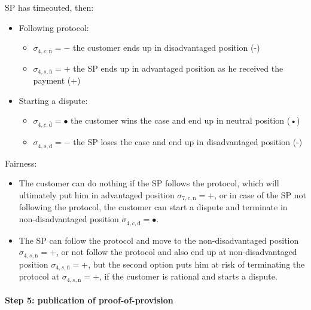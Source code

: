\documentclass{ieeeaccess}
\begin{document}
SP has timeouted, then:

\begin{itemize}
\item
  Following protocol:

  \begin{itemize}
  
  \item
    \(\sigma_{4, c, \overline{\mathrm{n}}} = -\) the customer ends up in
    disadvantaged position (-)
  \item
    \(\sigma_{4, s, \overline{\mathrm{n}}} = +\) the SP ends up in
    advantaged position as he received the payment (+)
  \end{itemize}
\item
  Starting a dispute:

  \begin{itemize}
  
  \item
    \(\sigma_{4, c, \overline{\mathrm{d}}} = •\) the customer wins the
    case and end up in neutral position (•)
  \item
    \(\sigma_{4, s, \overline{\mathrm{d}}} = -\) the SP loses the case
    and end up in disadvantaged position (-)
  \end{itemize}
\end{itemize}

Fairness:

\begin{itemize}

\item
  The customer can do nothing if the SP follows the protocol, which will
  ultimately put him in advantaged position
  \(\sigma_{7, c, \mathrm{n}} = +\), or in case of the SP not following
  the protocol, the customer can start a dispute and terminate in
  non-disadvantaged position
  \(\sigma_{4, c, \overline{\mathrm{d}}} = •\).
\item
  The SP can follow the protocol and move to the non-disadvantaged
  position \(\sigma_{4, s, \mathrm{n}} = +\), or not follow the protocol
  and also end up at non-disadvantaged position
  \(\sigma_{4, s, \overline{\mathrm{n}}} = +\), but the second option
  puts him at risk of terminating the protocol at
  \(\sigma_{4, s, \overline{\mathrm{n}}} = +\), if the customer is
  rational and starts a dispute.
\end{itemize}

\paragraph{Step 5: publication of
proof-of-provision}\label{step-5-publication-of-proof-of-provision}
\end{document}
